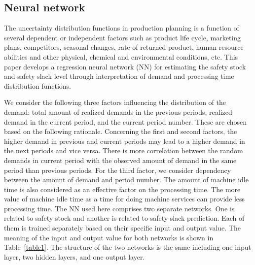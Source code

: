 \documentclass[letterpaper]{article} %
\begin{document}
\subsection{Neural network}
The uncertainty distribution functions in production planning is a function of several  dependent or independent factors such as product life cycle, marketing plans, competitors, seasonal changes, rate of returned product, human resource abilities and other physical, chemical and environmental conditions, etc. 
This paper develops a regression neural network (NN) for estimating the safety stock and safety slack level through interpretation of demand and processing time distribution functions.

We consider the following three factors influencing the distribution of the demand:
total amount of realized demands in the  previous periods,
realized demand in the current period, and the current period number.
%
These are chosen based on the following rationale.
%
Concerning the first and second factors, the higher demand in previous and current periods may lead to a higher demand in the next periods and vice versa. There is more correlation between the random demands in current period with the observed amount of demand in the same period than previous periods. For the third factor, we consider dependency between the amount of demand and period number. The amount of machine idle time is also considered as an effective factor on the processing time. The more value of machine idle time as a time for doing machine services can provide less processing time. The NN used here comprises two separate networks. One is related to safety stock and another is related to safety slack prediction. Each of them  is trained separately based on their specific input and output value. The meaning of the input and output value for both networks  is shown in Table~\ref{table1}. The structure of the two networks is the same including one input layer, two hidden layers, and one output layer.
\end{document}
